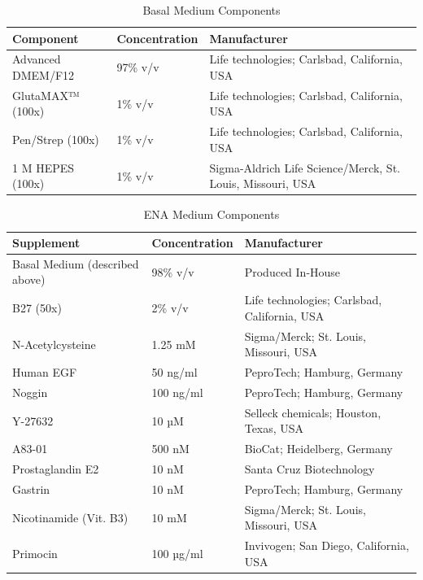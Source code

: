 \begin{flushleft}
\begin{table}[htbp]
\caption{Basal Medium Components}
\label{tab:basal_medium_components}
\begin{tabularx}{\textwidth}{Xll}
\toprule
\textbf{Component} &  \textbf{Concentration} & \textbf{Manufacturer} \\
\midrule
Advanced DMEM/F12 & 97\% v/v & Life technologies; Carlsbad, California, USA \\
GlutaMAX™ (100x) & 1\% v/v & Life technologies; Carlsbad, California, USA \\
Pen/Strep (100x) & 1\% v/v & Life technologies; Carlsbad, California, USA \\
1 M HEPES (100x) & 1\% v/v & Sigma-Aldrich Life Science/Merck, St. Louis, Missouri, USA \\
\bottomrule
\end{tabularx}
\end{table}

\begin{table}[htbp]
\caption{ENA Medium Components}
\label{tab:ena_medium_supplements}
\begin{tabularx}{\textwidth}{Xll}
\toprule
\textbf{Supplement} & \textbf{Concentration} & \textbf{Manufacturer} \\
\midrule
Basal Medium (described above) & 98\% v/v & Produced In-House \\
B27 (50x) & 2\% v/v & Life technologies; Carlsbad, California, USA \\
N-Acetylcysteine & 1.25 mM & Sigma/Merck; St. Louis, Missouri, USA \\
Human EGF & 50 ng/ml & PeproTech; Hamburg, Germany \\
Noggin & 100 ng/ml & PeproTech; Hamburg, Germany \\
Y-27632 & 10 µM & Selleck chemicals; Houston, Texas, USA \\
A83-01 & 500 nM & BioCat; Heidelberg, Germany \\
Prostaglandin E2 & 10 nM & Santa Cruz Biotechnology \\
Gastrin & 10 nM & PeproTech; Hamburg, Germany \\
Nicotinamide (Vit. B3) & 10 mM & Sigma/Merck; St. Louis, Missouri, USA \\
Primocin & 100 µg/ml & Invivogen; San Diego, California, USA \\
\bottomrule
\end{tabularx}
\end{table}



\end{flushleft}
